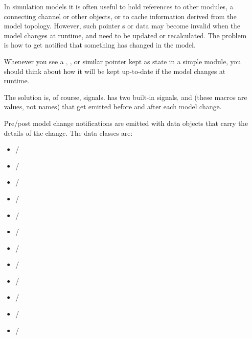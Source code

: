 \begin{note}
\begin{note}
In simulation models it is often useful to hold references to other
modules, a connecting channel or other objects, or to cache information
derived from the model topology. However, such pointer s or data may
become invalid when the model changes at runtime, and need to be updated
or recalculated. The problem is how to get notified that something has
changed in the model.

\begin{note}
  Whenever you see a , ,  or
  similar pointer kept as state in a simple module, you should think about
  how it will be kept up-to-date if the model changes at runtime.
\end{note}

The solution is, of course, signals. {\opp} has two built-in signals,
 and  (these macros
are  values, not names) that get emitted before and
after each model change.

Pre/post model change notifications are emitted with data objects that
carry the details of the change. The data classes are:

\begin{itemize}
  \item {} / 
  \item {} / 
  \item {} / 
  \item {} / 
  \item {} / 
  \item {} / 
  \item {} / 
  \item {} / 
  \item {} / 
  \item {} / 
  \item {} / 
  \item {} / 
\end{itemize}


\end{note}
\end{note}
